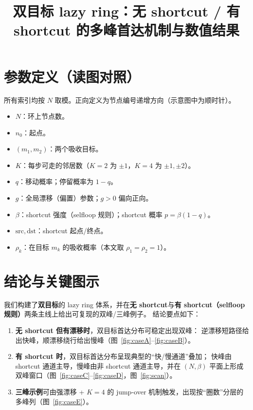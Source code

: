 \documentclass[11pt]{ctexart}
\title{双目标 lazy ring：无 shortcut / 有 shortcut 的多峰首达机制与数值结果}
\author{}
\date{}
\begin{document}
\sloppy
\maketitle

\section*{参数定义（读图对照）}
所有索引均按 $N$ 取模。正向定义为节点编号递增方向（示意图中为顺时针）。
\begin{itemize}
  \item $N$：环上节点数。
  \item $n_0$：起点。
  \item $(m_1,m_2)$：两个吸收目标。
  \item $K$：每步可走的邻居数（$K=2$ 为 $\pm1$，$K=4$ 为 $\pm1,\pm2$）。
  \item $q$：移动概率；停留概率为 $1-q$。
  \item $g$：全局漂移（偏置）参数；$g>0$ 偏向正向。
  \item $\beta$：shortcut 强度（selfloop 规则）；shortcut 概率 $p=\beta(1-q)$。
  \item $\mathrm{src},\mathrm{dst}$：shortcut 起点/终点。
  \item $\rho_k$：在目标 $m_k$ 的吸收概率（本文取 $\rho_1=\rho_2=1$）。
\end{itemize}

\section*{结论与关键图示}
我们构建了\textbf{双目标}的 lazy ring 体系，并在\textbf{无 shortcut}与\textbf{有 shortcut（selfloop 规则）}两条主线上给出可复现的双峰/三峰例子。
结论要点如下：
\begin{enumerate}
  \item \textbf{无 shortcut 但有漂移时}，双目标首达分布可稳定出现双峰：
  逆漂移短路径给出快峰，顺漂移绕行给出慢峰（图~\ref{fig:caseA}--\ref{fig:caseB}）。
  \item \textbf{有 shortcut 时}，双目标首达分布呈现典型的“快/慢通道”叠加；
  快峰由 shortcut 通道主导，慢峰由非 shortcut 通道主导，并在 $(N,\beta)$ 平面上形成双峰窗口（图~\ref{fig:caseC}--\ref{fig:caseD}，图~\ref{fig:scan}）。
  \item \textbf{三峰示例}可由强漂移 + $K=4$ 的 jump-over 机制触发，出现按“圈数”分层的多峰列（图~\ref{fig:caseE}）。
\end{enumerate}
\end{document}

